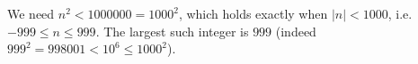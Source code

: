 We need $n^2<1000000=1000^2$, which holds exactly when $|n|<1000$, i.e. $-999\le n\le999$. The largest such integer is $\boxed{999}$ (indeed $999^2=998001<10^6\le1000^2$).
